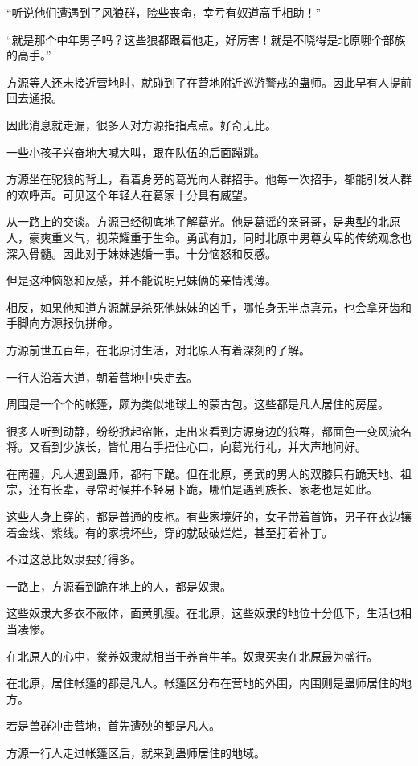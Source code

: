 \begin{this_body}
“听说他们遭遇到了风狼群，险些丧命，幸亏有奴道高手相助！”

“就是那个中年男子吗？这些狼都跟着他走，好厉害！就是不晓得是北原哪个部族的高手。”

方源等人还未接近营地时，就碰到了在营地附近巡游警戒的蛊师。因此早有人提前回去通报。

因此消息就走漏，很多人对方源指指点点。好奇无比。

一些小孩子兴奋地大喊大叫，跟在队伍的后面蹦跳。

方源坐在驼狼的背上，看着身旁的葛光向人群招手。他每一次招手，都能引发人群的欢呼声。可见这个年轻人在葛家十分具有威望。

从一路上的交谈。方源已经彻底地了解葛光。他是葛谣的亲哥哥，是典型的北原人，豪爽重义气，视荣耀重于生命。勇武有加，同时北原中男尊女卑的传统观念也深入骨髓。因此对于妹妹逃婚一事。十分恼怒和反感。

但是这种恼怒和反感，并不能说明兄妹俩的亲情浅薄。

相反，如果他知道方源就是杀死他妹妹的凶手，哪怕身无半点真元，也会拿牙齿和手脚向方源报仇拼命。

方源前世五百年，在北原讨生活，对北原人有着深刻的了解。

一行人沿着大道，朝着营地中央走去。

周围是一个个的帐篷，颇为类似地球上的蒙古包。这些都是凡人居住的房屋。

很多人听到动静，纷纷掀起帘帐，走出来看到方源身边的狼群，都面色一变风流名将。又看到少族长，皆忙用右手捂住心口，向葛光行礼，并大声地问好。

在南疆，凡人遇到蛊师，都有下跪。但在北原，勇武的男人的双膝只有跪天地、祖宗，还有长辈，寻常时候并不轻易下跪，哪怕是遇到族长、家老也是如此。

这些人身上穿的，都是普通的皮袍。有些家境好的，女子带着首饰，男子在衣边镶着金线、紫线。有的家境坏些，穿的就破破烂烂，甚至打着补丁。

不过这总比奴隶要好得多。

一路上，方源看到跪在地上的人，都是奴隶。

这些奴隶大多衣不蔽体，面黄肌瘦。在北原，这些奴隶的地位十分低下，生活也相当凄惨。

在北原人的心中，豢养奴隶就相当于养育牛羊。奴隶买卖在北原最为盛行。

在北原，居住帐篷的都是凡人。帐篷区分布在营地的外围，内围则是蛊师居住的地方。

若是兽群冲击营地，首先遭殃的都是凡人。

方源一行人走过帐篷区后，就来到蛊师居住的地域。


\end{this_body}
